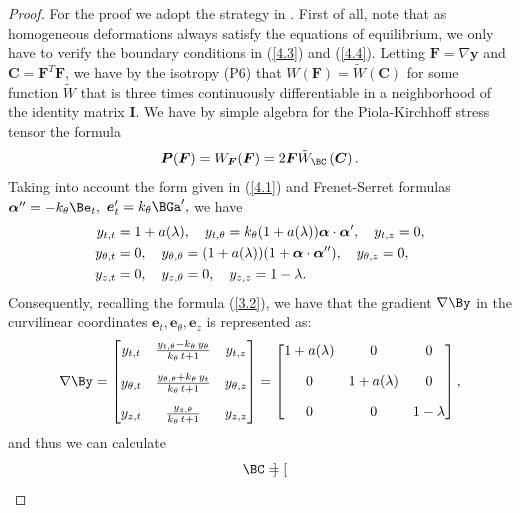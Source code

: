 \begin{proof}
For the proof we adopt the strategy in \cite{bib:Gra.Har.2}. First of all, note that as homogeneous deformations always satisfy the equations of equilibrium, we only have to verify the boundary conditions in (\ref{4.3}) and (\ref{4.4}). Letting $\bm F=\nabla\bm y$ and $\bm C= \bm F^T\bm F$, we have by the isotropy (P6) that $W(\bm F)=\tilde W\left(\bm C\right)$ for some function $\tilde W$ that is three times continuously differentiable in a neighborhood of the identity matrix $\boldsymbol{I}$. We have by simple algebra for the Piola-Kirchhoff stress tensor the formula
\begin{equation}
\label{4.5}
\boldsymbol{P}(\boldsymbol{F})=W_{\boldsymbol{F}}(\boldsymbol{F})=2 \boldsymbol{F} \tilde{W}_{\BC}\left(\boldsymbol{C}\right).
\end{equation}
Taking into account the form given in (\ref{4.1}) and Frenet-Serret formulas $\bm\alpha''=-k_\theta \Be_t,$ $\bm e'_t=k_\theta\BGa',$ we have 
\begin{align*}
    y_{t,t}&=1+a(\lambda),\quad y_{t,\theta}=k_\theta(1+a(\lambda))\bm\alpha\cdot \bm \alpha', \quad y_{t,z}=0,\\
    y_{\theta,t}&=0,\quad y_{\theta,\theta}=(1+a(\lambda))(1+\bm\alpha\cdot \bm\alpha''),\quad y_{\theta,z}=0,\\
    y_{z,t}&=0,\quad y_{z,\theta}=0,\quad y_{z,z}=1-\lambda.
\end{align*}
Consequently, recalling the formula (\ref{3.2}), we have that the gradient $\nabla \By$ in the curvilinear coordinates $\bm{e}_t,\bm{e}_\theta,\bm{e}_z$ is represented as:
\begin{equation}
\label{4.6}
\nabla \By=\begin{bmatrix} y_{t,t} & \frac{y_{t,\theta}-k_{\theta }\,y_\theta}{k_{\theta }\,t+1} & y_{t,z} \\[10pt]
y_{\theta,t} & \frac{y_{\theta,\theta}+k_{\theta }\,y_t}{k_{\theta }\,t+1} & y_{\theta,z}\\[10pt]
y_{z,t} & \frac{y_{z,\theta}}{k_{\theta }\,t+1} & y_{z,z} \end{bmatrix}=
 \begin{bmatrix}
1+a(\Gl) & 0 &0 \\[10pt]
 0 & 1+a(\Gl) & 0 \\[10pt]
  0 & 0 & 1-\Gl
\end{bmatrix},
\end{equation}
and thus we can calculate
\begin{equation}
\label{4.7}
\BC=\begin{bmatrix}

\end{bmatrix}
\end{equation}
\end{proof}
